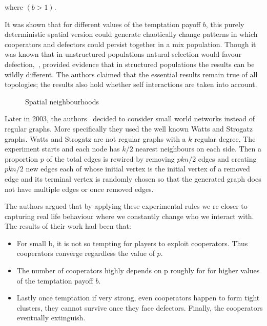 \documentclass{article}
\theoremstyle{definition}
\begin{document}
where \((b>1)\).

It was shown that for different values of the temptation payoff \(b\), this purely
deterministic spatial version could generate chaotically change patterns in which
cooperators and defectors could persist together in a mix population. 
Though it was known that in unstructured populations natural selection would favour
defection,~\cite{Nowak1992}, provided evidence that in structured populations
the results can be wildly different.
The authors claimed that the essential results remain true of all topologies; 
the results also hold whether self interactions are taken into account.

\begin{figure}[!hbtp]
\centering
    \begin{subfigure}{.25\textwidth}
        
    \end{subfigure}
    \begin{subfigure}{.25\textwidth}\centering
        
     \end{subfigure}
     \begin{subfigure}{.25\textwidth}\centering
        
     \end{subfigure}
     \caption{Spatial neighbourhoods}\label{fig:topologies}
    \end{figure}


Later in 2003, the authors~\cite{MASUDA2003} decided to consider small world
networks instead of regular graphs. More specifically they used the well
known Watts and Strogatz~\cite{watts1998} graphs. Watts and Strogatz are not
regular graphs with a \(k\) regular degree. The experiment starts and each node
has \(k/2\) nearest neighbours on each side.  Then a proportion \(p\) of
the total edges is rewired by removing \(pkn/2\) edges and creating
\(pkn/2\) new edges each of whose initial vertex is the initial vertex of a removed
edge and its terminal vertex is randomly chosen so that the generated graph does
not have multiple edges or once removed edges.

The authors argued that by applying these experimental rules we re closer to
capturing real life behaviour where we constantly change who we interact with.
The results of their work had been that:

\begin{itemize}
    \item For small b, it is not so tempting for players to exploit cooperators.
    Thus cooperators converge regardless the value of \(p\).
    \item The number of cooperators highly depends on p roughly for for higher
    values of the temptation payoff \(b\).
    \item Lastly once temptation if very strong, even cooperators happen to form
    tight clusters, they cannot survive once they face defectors. Finally, the 
    cooperators eventually extinguish.
\end{itemize}
\end{document}
